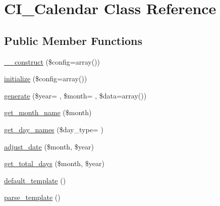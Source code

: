 \hypertarget{class_c_i___calendar}{}\section{C\+I\+\_\+\+Calendar Class Reference}
\label{class_c_i___calendar}
\subsection*{Public Member Functions}
\begin{DoxyCompactItemize}
\item 
\hyperlink{class_c_i___calendar_af7f9493844d2d66e924e3c1df51ce616}{\+\_\+\+\_\+construct} (\$config=array())
\item 
\hyperlink{class_c_i___calendar_a481385e36d920f5a5005ace05c6cd016}{initialize} (\$config=array())
\item 
\hyperlink{class_c_i___calendar_a532f3b6ce22d22e01ace95a24a6f7179}{generate} (\$year= \textquotesingle{}\textquotesingle{}, \$month= \textquotesingle{}\textquotesingle{}, \$data=array())
\item 
\hyperlink{class_c_i___calendar_a056208e620b0ffc2525a07d8646eb194}{get\+\_\+month\+\_\+name} (\$month)
\item 
\hyperlink{class_c_i___calendar_ac0f5e250a3694e74e4a160557f91b8ca}{get\+\_\+day\+\_\+names} (\$day\+\_\+type= \textquotesingle{}\textquotesingle{})
\item 
\hyperlink{class_c_i___calendar_ac216356ab0ff31e8538fd9208a26577a}{adjust\+\_\+date} (\$month, \$year)
\item 
\hyperlink{class_c_i___calendar_a3c863f62907e445af2711df11fb90ff9}{get\+\_\+total\+\_\+days} (\$month, \$year)
\item 
\hyperlink{class_c_i___calendar_a5d174710ed7a2a08df21dbaa2bb6a50f}{default\+\_\+template} ()
\item 
\hyperlink{class_c_i___calendar_ac0331959620d18320ab6587621730d44}{parse\+\_\+template} ()
\end{DoxyCompactItemize}
